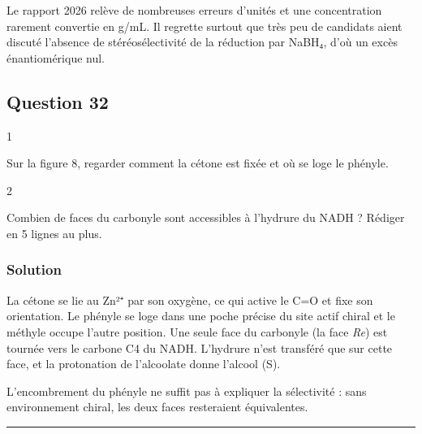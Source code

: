 \documentclass[11pt,a4paper]{article}
\begin{document}
\begin{jury}

Le rapport 2026 relève de nombreuses erreurs d'unités et une concentration rarement convertie en g/mL. Il regrette surtout que très peu de candidats aient discuté l'absence de stéréosélectivité de la réduction par NaBH₄, d'où un excès énantiomérique nul.

\end{jury}

\hypertarget{question-32}{%
\subsection{Question 32}\label{question-32}}

\begin{indication}{1}

Sur la figure 8, regarder comment la cétone est fixée et où se loge le phényle.

\end{indication}

\begin{indication}{2}

Combien de faces du carbonyle sont accessibles à l'hydrure du NADH ? Rédiger en 5 lignes au plus.

\end{indication}

\hypertarget{solution-31}{%
\subsubsection{Solution}\label{solution-31}}

La cétone se lie au Zn²⁺ par son oxygène, ce qui active le C=O et fixe son orientation. Le phényle se loge dans une poche précise du site actif chiral et le méthyle occupe l'autre position. Une seule face du carbonyle (la face \emph{Re}) est tournée vers le carbone C4 du NADH. L'hydrure n'est transféré que sur cette face, et la protonation de l'alcoolate donne l'alcool (S).

\begin{piege}

L'encombrement du phényle ne suffit pas à expliquer la sélectivité : sans environnement chiral, les deux faces resteraient équivalentes.

\end{piege}

\begin{center}\rule{0.5\linewidth}{0.5pt}\end{center}
\end{document}
